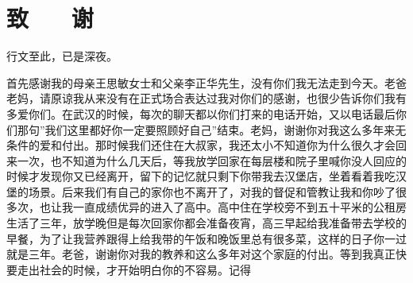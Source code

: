 \section*{致 ~~ 谢}

行文至此，已是深夜。

首先感谢我的母亲王思敏女士和父亲李正华先生，没有你们我无法走到今天。老爸老妈，请原谅我从来没有在正式场合表达过我对你们的感谢，也很少告诉你们我有多爱你们。在武汉的时候，每次的聊天都以你们打来的电话开始，又以电话最后你们那句”我们这里都好你一定要照顾好自己”结束。老妈，谢谢你对我这么多年来无条件的爱和付出。那时候我们还住在大叔家，我还太小不知道你为什么很久才会回来一次，也不知道为什么几天后，等我放学回家在每层楼和院子里喊你没人回应的时候才发现你又已经离开，留下的记忆就只剩下你带我去汉堡店，坐着看着我吃汉堡的场景。后来我们有自己的家你也不离开了，对我的督促和管教让我和你吵了很多次，也让我一直成绩优异的进入了高中。高中住在学校旁不到五十平米的公租房生活了三年，放学晚但是每次回家你都会准备夜宵，高三早起给我准备带去学校的早餐，为了让我营养跟得上给我带的午饭和晚饭里总有很多菜，这样的日子你一过就是三年。老爸，谢谢你对我的教养和这么多年对这个家庭的付出。等到我真正快要走出社会的时候，才开始明白你的不容易。记得